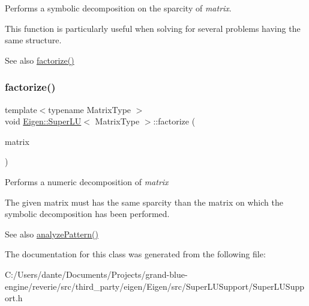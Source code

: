 Performs a symbolic decomposition on the sparcity of {\itshape matrix}.

This function is particularly useful when solving for several problems having the same structure.

\begin{DoxySeeAlso}{See also}
\mbox{\hyperlink{class_eigen_1_1_super_l_u_a0b5a5fbda1a1f368003c7c01021a4636}{factorize()}} 
\end{DoxySeeAlso}
\mbox{\label{class_eigen_1_1_super_l_u_a0b5a5fbda1a1f368003c7c01021a4636}} 
\subsubsection{\texorpdfstring{factorize()}{factorize()}}
{\footnotesize\ttfamily template$<$typename Matrix\+Type $>$ \\
void \mbox{\hyperlink{class_eigen_1_1_super_l_u}{Eigen\+::\+Super\+LU}}$<$ Matrix\+Type $>$\+::factorize (\begin{DoxyParamCaption}\item[{const Matrix\+Type \&}]{matrix }\end{DoxyParamCaption})}

Performs a numeric decomposition of {\itshape matrix} 

The given matrix must has the same sparcity than the matrix on which the symbolic decomposition has been performed.

\begin{DoxySeeAlso}{See also}
\mbox{\hyperlink{class_eigen_1_1_super_l_u_a493cdfada27415a6037b004ff974eace}{analyze\+Pattern()}} 
\end{DoxySeeAlso}


The documentation for this class was generated from the following file\+:\begin{DoxyCompactItemize}
\item 
C\+:/\+Users/dante/\+Documents/\+Projects/grand-\/blue-\/engine/reverie/src/third\+\_\+party/eigen/\+Eigen/src/\+Super\+L\+U\+Support/Super\+L\+U\+Support.\+h\end{DoxyCompactItemize}
